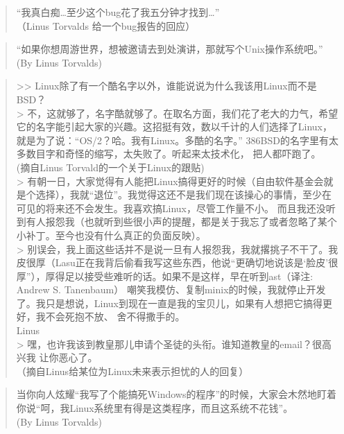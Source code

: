 \documentclass[12pt,a4paper]{article}
\begin{document}
\begin{verse}
“我真白痴\ldots{}至少这个bug花了我五分钟才找到\ldots{}”\\
（Linus Torvalds 给一个bug报告的回应）\\
\end{verse}

\begin{verse}
“如果你想周游世界，想被邀请去到处演讲，那就写个Unix操作系统吧。”\\
(By Linus Torvalds)\\
\end{verse}

\begin{verse}
>> Linux除了有一个酷名字以外，谁能说说为什么我该用Linux而不是BSD？\\
> 不，这就够了，名字酷就够了。在取名方面，我们花了老大的力气，希望它的名字能引起大家的兴趣。这招挺有效，数以千计的人们选择了Linux，就是为了说：“OS/2？哈。我有Linux。多酷的名字。” 386BSD的名字里有太多数目字和奇怪的缩写，太失败了。听起来太技术化， 把人都吓跑了。\\
(摘自Linus Torvald的一个关于Linux的跟贴)\\
> 有朝一日，大家觉得有人能把Linux搞得更好的时候（自由软件基金会就是个选择），我就“退位”。我觉得这还不是我们现在该操心的事情，至少在可见的将来还不会发生。我喜欢搞Linux，尽管工作量不小。 而且我还没听到有人报怨我（也就听到些很小声的提醒，都是关于我忘了或者忽略了某个小补丁。至今也没有什么真正的负面反映）。\\
> 别误会，我上面这些话并不是说一旦有人报怨我，我就撂挑子不干了。我皮很厚（Lasu正在我背后偷看我写这些东西，他说“更确切地说该是‘脸皮’很厚”），厚得足以接受些难听的话。如果不是这样，早在听到ast（译注: Andrew S. Tanenbaum） 嘲笑我模仿、复制minix的时候，我就停止开发了。我只是想说，Linux到现在一直是我的宝贝儿，如果有人想把它搞得更好，我不会死抱不放、 舍不得撒手的。\\
\hspace*{1cm}Linus\\
> 嘿，也许我该到教皇那儿申请个圣徒的头衔。谁知道教皇的email？很高兴我 让你恶心了。\\
（摘自Linus给某位为Linux未来表示担忧的人的回复）\\
\end{verse}

\begin{verse}
当你向人炫耀“我写了个能搞死Windows的程序”的时候，大家会木然地盯着你说“呵，我Linux系统里有得是这类程序，而且这系统不花钱”。\\
(By Linus Torvalds)\\
\end{verse}
\end{document}
